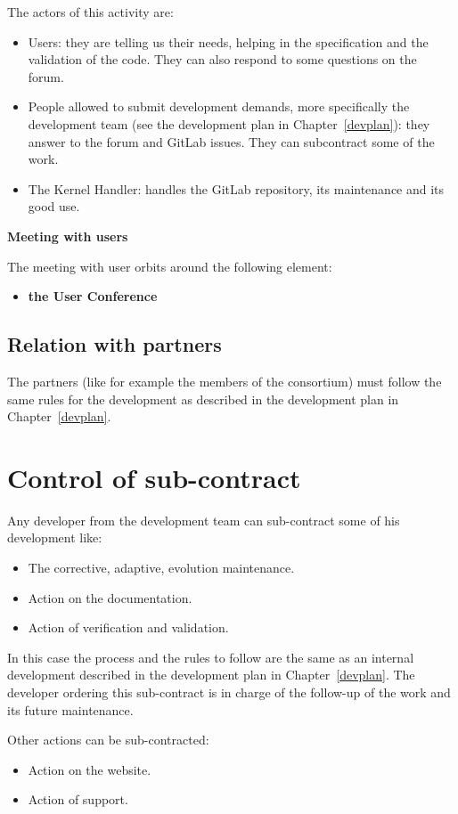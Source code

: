 The actors of this activity are:
\begin{itemize}
\item Users: they are telling us their needs, helping in the specification and
  the validation of the code. They can also respond to some questions on the
  forum.
\item People allowed to submit development demands, more specifically the
  development team (see the development plan in Chapter~\ref{devplan}): they
  answer to the forum and GitLab issues\@. They can subcontract some of the
  work.
\item The Kernel Handler: handles the GitLab repository, its maintenance and
  its good use.
\end{itemize}

\textbf{Meeting with users}

The meeting with user orbits around the following element:
\begin{itemize}
  \item \textbf{the \telemacsystem{} User Conference}
\end{itemize}

\subsection{Relation with partners}

The partners (like for example the members of the \telemacsystem{} consortium)
must follow the same rules for the development as described in the development
plan in Chapter~\ref{devplan}.

\section{Control of sub-contract}

Any developer from the development team can sub-contract some of his
development like:
\begin{itemize}
\item The corrective, adaptive, evolution maintenance.
\item Action on the documentation.
\item Action of verification and validation.
\end{itemize}

In this case the process and the rules to follow are the same as an internal
development described in the development plan in Chapter~\ref{devplan}. The
developer ordering this sub-contract is in charge of the follow-up of the work
and its future maintenance.

Other actions can be sub-contracted:
\begin{itemize}
\item Action on the website.
\item Action of support.
\end{itemize}
